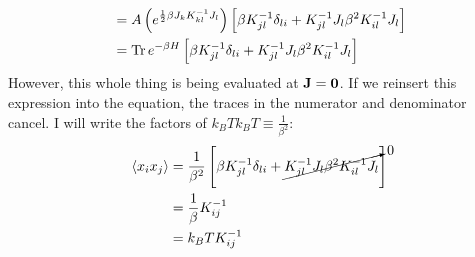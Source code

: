 \documentclass[a4paper,twoside]{article}
\begin{document}
\begin{itemize}
\begin{problem}
\begin{align}
                &= A \left( e^{\frac{1}{2} \beta J_k K_{kl}^{-1} J_l} \right) \left[ \beta K_{jl}^{-1} \delta_{li} + K_{jl}^{-1} J_l \beta^2 K_{il}^{-1} J_l \right] \\
                &= \Tr e^{- \beta H} \left[ \beta K_{jl}^{-1} \delta_{li} + K_{jl}^{-1} J_l \beta^2 K_{il}^{-1} J_l \right]
            \end{align}
            However, this whole thing is being evaluated at $ \vb{J} = \vb{0} $. If we reinsert this expression into the equation, the traces in the numerator and denominator cancel. I will write the factors of $ k_B T k_B T \equiv \frac{1}{\beta^2} $:
            \begin{align}
                \ev{x_i x_j} &= \frac{1}{\beta^2}  \left[ \beta K_{jl}^{-1} \delta_{li} + \cancelto{0}{K_{jl}^{-1} J_l \beta^2 K_{il}^{-1} J_l} \right] \\
                &= \frac{1}{\beta} K_{ij}^{-1} \\
                &= k_B T K_{ij}^{-1}
            \end{align}
        \end{problem}
\end{itemize}
\end{document}
